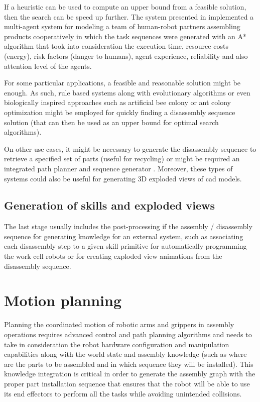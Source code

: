 If a heuristic can be used to compute an upper bound from a feasible solution, then the search can be speed up further. The system presented in \cite{Johannsmeier2017} implemented a multi-agent system for modeling a team of human-robot partners assembling products cooperatively in which the task sequences were generated with an A* algorithm that took into consideration the execution time, resource costs (energy), risk factors (danger to humans), agent experience, reliability and also attention level of the agents.

For some particular applications, a feasible and reasonable solution might be enough. As such, rule based systems \cite{Smith2011} along with evolutionary algorithms \cite{Elsayed2012} or even biologically inspired approaches such as artificial bee colony \cite{Yuan2016} or ant colony optimization \cite{Liu2012} might be employed for quickly finding a disassembly sequence solution (that can then be used as an upper bound for optimal search algorithms).

On other use cases, it might be necessary to generate the disassembly sequence to retrieve a specified set of parts \cite{Smith2012} (useful for recycling) or might be required an integrated path planner and sequence generator \cite{Le2009}. Moreover, these types of systems could also be useful for generating 3D exploded views \cite{Li2008} of \gls{cad} models.


\subsection{Generation of skills and exploded views}

The last stage usually includes the post-processing if the assembly / disassembly sequence for generating knowledge for an external system, such as associating each disassembly step to a given skill primitive \cite{Thomas2003} for automatically programming the work cell robots or for creating exploded view animations from the disassembly sequence.



\section{Motion planning}

Planning the coordinated motion of robotic arms \cite{Rickert2011} and grippers in assembly operations requires advanced control \cite{Stolt2015} and path planning algorithms \cite{Kuffner2000,You2012,Fontanals2014,mopl2015} and needs to take in consideration the robot hardware configuration and manipulation capabilities along with the world state and assembly knowledge \cite{Tenorth14} (such as where are the parts to be assembled and in which sequence they will be installed). This knowledge integration is critical in order to generate the assembly graph with the proper part installation sequence that ensures that the robot will be able to use its end effectors to perform all the tasks \cite{Thomas2003,Thomas2011} while avoiding unintended collisions.


